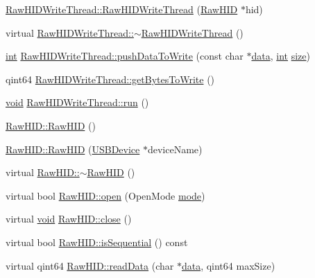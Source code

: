 \begin{DoxyCompactItemize}
\item 
\hyperlink{group___raw_h_i_d_plugin_gac9c8ee05f180a569c664780b9760849e}{Raw\-H\-I\-D\-Write\-Thread\-::\-Raw\-H\-I\-D\-Write\-Thread} (\hyperlink{class_raw_h_i_d}{Raw\-H\-I\-D} $\ast$hid)
\item 
virtual \hyperlink{group___raw_h_i_d_plugin_gaf760c0fa4d7799e982c74e1b6aaba378}{Raw\-H\-I\-D\-Write\-Thread\-::$\sim$\-Raw\-H\-I\-D\-Write\-Thread} ()
\item 
\hyperlink{ioapi_8h_a787fa3cf048117ba7123753c1e74fcd6}{int} \hyperlink{group___raw_h_i_d_plugin_ga563f2214706aafbf75b158b6ca2ed73e}{Raw\-H\-I\-D\-Write\-Thread\-::push\-Data\-To\-Write} (const char $\ast$\hyperlink{glext_8h_a8850df0785e6fbcc2351af3b686b8c7a}{data}, \hyperlink{ioapi_8h_a787fa3cf048117ba7123753c1e74fcd6}{int} \hyperlink{glext_8h_a014d89bd76f74ef3a29c8f04b473eb76}{size})
\item 
qint64 \hyperlink{group___raw_h_i_d_plugin_ga33316914e9994a7ee878bffe07175781}{Raw\-H\-I\-D\-Write\-Thread\-::get\-Bytes\-To\-Write} ()
\item 
\hyperlink{group___u_a_v_objects_plugin_ga444cf2ff3f0ecbe028adce838d373f5c}{void} \hyperlink{group___raw_h_i_d_plugin_gaac9f3dfe020b10edc1c5677e07b36d04}{Raw\-H\-I\-D\-Write\-Thread\-::run} ()
\item 
\hyperlink{group___raw_h_i_d_plugin_gab8670136473a97cded80dd1a4e785680}{Raw\-H\-I\-D\-::\-Raw\-H\-I\-D} ()
\item 
\hyperlink{group___raw_h_i_d_plugin_gae7f570657448daa4890a0e38f693e6ed}{Raw\-H\-I\-D\-::\-Raw\-H\-I\-D} (\hyperlink{class_u_s_b_device}{U\-S\-B\-Device} $\ast$device\-Name)
\item 
virtual \hyperlink{group___raw_h_i_d_plugin_gaa925a3d3cbb80dd61705cedd4a0d5167}{Raw\-H\-I\-D\-::$\sim$\-Raw\-H\-I\-D} ()
\item 
virtual bool \hyperlink{group___raw_h_i_d_plugin_ga58a13b23858ae0b323802154fa2b93a8}{Raw\-H\-I\-D\-::open} (Open\-Mode \hyperlink{glext_8h_a1e71d9c196e4683cc06c4b54d53f7ef5}{mode})
\item 
virtual \hyperlink{group___u_a_v_objects_plugin_ga444cf2ff3f0ecbe028adce838d373f5c}{void} \hyperlink{group___raw_h_i_d_plugin_gad109f6050214525dde9804f5a20bf53f}{Raw\-H\-I\-D\-::close} ()
\item 
virtual bool \hyperlink{group___raw_h_i_d_plugin_gaf9b8ab547528829a7ef19c1d9a9e692a}{Raw\-H\-I\-D\-::is\-Sequential} () const 
\item 
virtual qint64 \hyperlink{group___raw_h_i_d_plugin_gac4b532c2c57925141897d91434924e80}{Raw\-H\-I\-D\-::read\-Data} (char $\ast$\hyperlink{glext_8h_a8850df0785e6fbcc2351af3b686b8c7a}{data}, qint64 max\-Size)

\end{DoxyCompactItemize}
